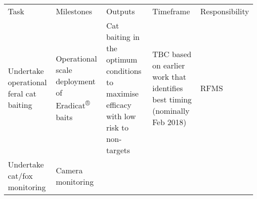 \documentclass[version=last,
    paper=a4,                               %
    10pt,                                   %
    dvipsnames,
    oneside,                              %
    headings=openany,                       %
    open=any,
    BCOR=7mm,                               %
    DIV=15,     %
]{scrbook}
\begin{document}
\begin{longtable}[c]{@{}lllll@{}}
\toprule\addlinespace
\begin{minipage}[t]{0.17\columnwidth}\raggedright
Task
\end{minipage} & \begin{minipage}[t]{0.17\columnwidth}\raggedright
Milestones
\end{minipage} & \begin{minipage}[t]{0.17\columnwidth}\raggedright
Outputs
\end{minipage} & \begin{minipage}[t]{0.17\columnwidth}\raggedright
Timeframe
\end{minipage} & \begin{minipage}[t]{0.17\columnwidth}\raggedright
Responsibility
\end{minipage}
\\\addlinespace
\begin{minipage}[t]{0.17\columnwidth}\raggedright
Undertake operational feral cat baiting
\end{minipage} & \begin{minipage}[t]{0.17\columnwidth}\raggedright
Operational scale deployment of Eradicat\textsuperscript{®} baits
\end{minipage} & \begin{minipage}[t]{0.17\columnwidth}\raggedright
Cat baiting in the optimum conditions to maximise efficacy with low risk
to non-targets
\end{minipage} & \begin{minipage}[t]{0.17\columnwidth}\raggedright
TBC based on earlier work that identifies best timing (nominally Feb
2018)
\end{minipage} & \begin{minipage}[t]{0.17\columnwidth}\raggedright
RFMS
\end{minipage}
\\\addlinespace
\begin{minipage}[t]{0.17\columnwidth}\raggedright
Undertake cat/fox monitoring
\end{minipage} & \begin{minipage}[t]{0.17\columnwidth}\raggedright
Camera monitoring


\end{minipage}
\end{longtable}
\end{document}
